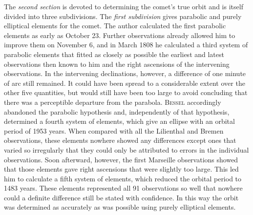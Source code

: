The \emph{second section} is devoted to determining the comet's true orbit and is itself divided into three subdivisions. The \emph{first subdivision} gives parabolic and purely elliptical elements for the comet. The author calculated the first parabolic elements as early as October 23. Further observations already allowed him to improve them on November 6, and in March 1808 he calculated a third system of parabolic elements that fitted as closely as possible the earliest and latest observations then known to him and the right ascensions of the intervening observations. In the intervening declinations, however, a difference of one minute of arc still remained. It could have been spread to a considerable extent over the other five quantities, but would still have been too large to avoid concluding that there was a perceptible departure from the parabola. \textsc{Bessel} accordingly abandoned the parabolic hypothesis and, independently of that hypothesis, determined a fourth system of elements, which give an ellipse with an orbital period of 1953 years. When compared with all the Lilienthal and Bremen observations, these elements nowhere showed any differences except ones that varied so irregularly that they could only be attributed to errors in the individual observations. Soon afterward, however, the first Marseille observations showed that those elements gave right ascensions that were slightly too large. This led him to calculate a fifth system of elements, which reduced the orbital period to 1483 years. These elements represented all 91 observations so well that nowhere could a definite difference still be stated with confidence. In this way the orbit was determined as accurately as was possible using purely elliptical elements.

